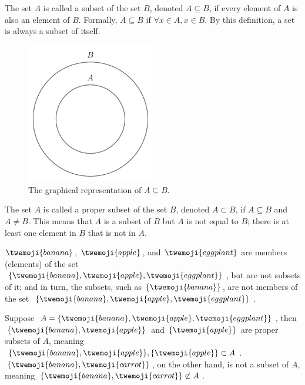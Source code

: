 \begin{definition}[Subset]
	\label{def:subset}
	The set $A$ is called a subset of the set $B$, denoted $A \subseteq B$, if every element of $A$ is also an element of $B$. Formally, $A\subseteq B$ if $\forall x \in A, x \in B$. By this definition, a set is always a subset of itself.
	\begin{figure}[H]
		\centering
		\includegraphics[width = 0.5\textwidth]{figures/set_subset.pdf}
		\caption{The graphical representation of $A\subseteq B$.}
		\label{fig:set_subset}
	\end{figure}
\end{definition}

\begin{definition}
	\label{def:proper_subset}
	The set $A$ is called a proper subset of the set $B$, denoted $A \subset B$, if $A \subseteq B$ and $A \neq B$. This means that $A$ is a subset of $B$ but $A$ is not equal to $B$; there is at least one element in $B$ that is not in $A$.
\end{definition}

\begin{example}
	$\twemoji{banana}$, $\twemoji{apple}$, and $\twemoji{eggplant}$ are members (elements) of the set $\{\twemoji{banana}, \twemoji{apple}, \twemoji{eggplant}\}$, but are not subsets of it; and in turn, the subsets, such as $\{\twemoji{banana}\}$, are not members of the set $\{\twemoji{banana}, \twemoji{apple}, \twemoji{eggplant}\}$.
\end{example}

\begin{example}
	Suppose $A = \{\twemoji{banana}, \twemoji{apple}, \twemoji{eggplant}\}$, then $\{\twemoji{banana}, \twemoji{apple}\}$ and $\{\twemoji{apple}\}$ are proper subsets of $A$, meaning $\{\twemoji{banana}, \twemoji{apple}\},\{\twemoji{apple}\}\subset  A$. $\{\twemoji{banana}, \twemoji{carrot}\}$, on the other hand, is not a subset of $A$, meaning $\{\twemoji{banana}, \twemoji{carrot}\}\not\subset  A$.
\end{example}

